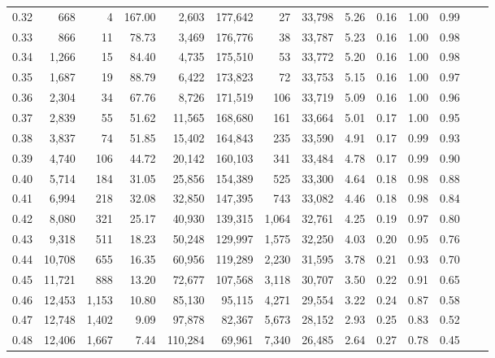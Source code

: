 \begin{tabular}{rrrrrrrrrrrrrr}
0.32 &     668 &      4 &  167.00 &    2,603 &  177,642 &      27 &  33,798 &  5.26 &  0.16 &  1.00 &      0.99 \\
0.33 &     866 &     11 &   78.73 &    3,469 &  176,776 &      38 &  33,787 &  5.23 &  0.16 &  1.00 &      0.98 \\
0.34 &   1,266 &     15 &   84.40 &    4,735 &  175,510 &      53 &  33,772 &  5.20 &  0.16 &  1.00 &      0.98 \\
0.35 &   1,687 &     19 &   88.79 &    6,422 &  173,823 &      72 &  33,753 &  5.15 &  0.16 &  1.00 &      0.97 \\
0.36 &   2,304 &     34 &   67.76 &    8,726 &  171,519 &     106 &  33,719 &  5.09 &  0.16 &  1.00 &      0.96 \\
0.37 &   2,839 &     55 &   51.62 &   11,565 &  168,680 &     161 &  33,664 &  5.01 &  0.17 &  1.00 &      0.95 \\
0.38 &   3,837 &     74 &   51.85 &   15,402 &  164,843 &     235 &  33,590 &  4.91 &  0.17 &  0.99 &      0.93 \\
0.39 &   4,740 &    106 &   44.72 &   20,142 &  160,103 &     341 &  33,484 &  4.78 &  0.17 &  0.99 &      0.90 \\
0.40 &   5,714 &    184 &   31.05 &   25,856 &  154,389 &     525 &  33,300 &  4.64 &  0.18 &  0.98 &      0.88 \\
0.41 &   6,994 &    218 &   32.08 &   32,850 &  147,395 &     743 &  33,082 &  4.46 &  0.18 &  0.98 &      0.84 \\
0.42 &   8,080 &    321 &   25.17 &   40,930 &  139,315 &   1,064 &  32,761 &  4.25 &  0.19 &  0.97 &      0.80 \\
0.43 &   9,318 &    511 &   18.23 &   50,248 &  129,997 &   1,575 &  32,250 &  4.03 &  0.20 &  0.95 &      0.76 \\
0.44 &  10,708 &    655 &   16.35 &   60,956 &  119,289 &   2,230 &  31,595 &  3.78 &  0.21 &  0.93 &      0.70 \\
0.45 &  11,721 &    888 &   13.20 &   72,677 &  107,568 &   3,118 &  30,707 &  3.50 &  0.22 &  0.91 &      0.65 \\
0.46 &  12,453 &  1,153 &   10.80 &   85,130 &   95,115 &   4,271 &  29,554 &  3.22 &  0.24 &  0.87 &      0.58 \\
0.47 &  12,748 &  1,402 &    9.09 &   97,878 &   82,367 &   5,673 &  28,152 &  2.93 &  0.25 &  0.83 &      0.52 \\
0.48 &  12,406 &  1,667 &    7.44 &  110,284 &   69,961 &   7,340 &  26,485 &  2.64 &  0.27 &  0.78 &      0.45 \\

\end{tabular}
